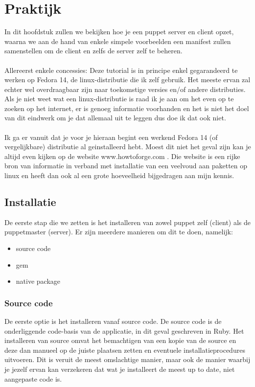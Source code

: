 \chapter{Praktijk}
In dit hoofdstuk zullen we bekijken hoe je een puppet server en client opzet, waarna we aan de hand van enkele simpele voorbeelden een manifest zullen samenstellen om de client en zelfs de server zelf te beheren.\\\\
Allereerst enkele concessies: Deze tutorial is in principe enkel gegarandeerd te werken op Fedora 14, de linux-distributie die ik zelf gebruik. Het meeste ervan zal echter wel overdraagbaar zijn naar toekomstige versies en/of andere distributies. Als je niet weet wat een linux-distributie is raad ik je aan om het even op te zoeken op het internet, er is genoeg informatie voorhanden en het is niet het doel van dit eindwerk om je dat allemaal uit te leggen dus doe ik dat ook niet.\\\\
Ik ga er vanuit dat je voor je hieraan begint een werkend Fedora 14 (of vergelijkbare) distributie al geinstalleerd hebt. Moest dit niet het geval zijn kan je altijd even kijken op de website www.howtoforge.com . Die website is een rijke bron van informatie in verband met installatie van een veelvoud aan paketten op linux en heeft dan ook al een grote hoeveelheid bijgedragen aan mijn kennis.


\section{Installatie}
De eerste stap die we zetten is het installeren van zowel puppet zelf (client) als de puppetmaster (server). Er zijn meerdere manieren om dit te doen, namelijk:
\begin{itemize}
\item source code
\item gem
\item native package
\end{itemize}

\subsection{Source code}
De eerste optie is het installeren vanaf source code. De source code is de onderliggende code-basis van de applicatie, in dit geval geschreven in Ruby. Het installeren van source omvat het bemachtigen van een kopie van de source en deze dan manueel op de juiste plaatsen zetten en eventuele installatieprocedures uitvoeren. Dit is veruit de meest omslachtige manier, maar ook de manier waarbij je jezelf ervan kan verzekeren dat wat je installeert de meest up to date, niet aangepaste code is.
%
